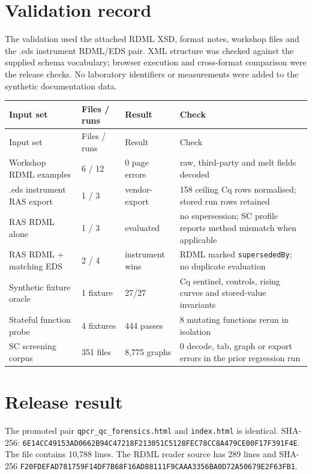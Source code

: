 \section{Validation record}
The validation used the attached RDML XSD, format notes, workshop files and the .eds instrument RDML/EDS pair. XML structure was checked against the supplied schema vocabulary; browser execution and cross-format comparison were the release checks. No laboratory identifiers or measurements were added to the synthetic documentation data.

\begin{center}\small
\begin{xltabular}{\linewidth}{|X|X|X|X|}\toprule
Input set & Files / runs & Result & Check\\\midrule\endfirsthead
\toprule Input set & Files / runs & Result & Check\\\midrule\endhead
Workshop RDML examples & 6 / 12 & 0 page errors & raw, third-party and melt fields decoded\\
.eds instrument RAS export & 1 / 3 & vendor-export & 158 ceiling Cq rows normalised; stored run rows retained\\
RAS RDML alone & 1 / 3 & evaluated & no supersession; SC profile reports method mismatch when applicable\\
RAS RDML + matching EDS & 2 / 4 & instrument wins & RDML marked \texttt{supersededBy}; no duplicate evaluation\\
Synthetic fixture oracle & 1 fixture & 27/27 & Cq sentinel, controls, rising curves and stored-value invariants\\
Stateful function probe & 4 fixtures & 444 passes & 8 mutating functions rerun in isolation\\
SC screening corpus & 351 files & 8,775 graphs & 0 decode, tab, graph or export errors in the prior regression run\\\bottomrule
\end{xltabular}
\end{center}

\section{Release result}
The promoted pair \texttt{qpcr\_qc\_forensics.html} and \texttt{index.html} is identical. SHA-256: \texttt{6E14CC49\allowbreak{}153AD066\allowbreak{}2B94C472\allowbreak{}18F21305\allowbreak{}1C5128FE\allowbreak{}C78CC8A4\allowbreak{}79CE00F1\allowbreak{}7F391F4E}. The file contains 10,788 lines. The RDML reader source has 289 lines and SHA-256 \texttt{F20FDEFA\allowbreak{}D781759F\allowbreak{}14DF7B68\allowbreak{}F16AD881\allowbreak{}11F9CAAA\allowbreak{}3356BA0D\allowbreak{}72A50679\allowbreak{}E2F63FB1}.



